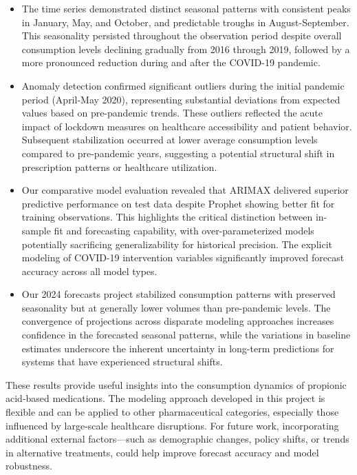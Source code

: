 \documentclass[10pt]{article}
\begin{document}
\begin{itemize}
    \item The time series demonstrated distinct seasonal patterns with consistent peaks in January, May, and October, and predictable troughs in August-September. This seasonality persisted throughout the observation period despite overall consumption levels declining gradually from 2016 through 2019, followed by a more pronounced reduction during and after the COVID-19 pandemic.
    \item Anomaly detection confirmed significant outliers during the initial pandemic period (April-May 2020), representing substantial deviations from expected values based on pre-pandemic trends. These outliers reflected the acute impact of lockdown measures on healthcare accessibility and patient behavior. Subsequent stabilization occurred at lower average consumption levels compared to pre-pandemic years, suggesting a potential structural shift in prescription patterns or healthcare utilization.
    \item Our comparative model evaluation revealed that ARIMAX delivered superior predictive performance on test data despite Prophet showing better fit for training observations. This highlights the critical distinction between in-sample fit and forecasting capability, with over-parameterized models potentially sacrificing generalizability for historical precision. The explicit modeling of COVID-19 intervention variables significantly improved forecast accuracy across all model types.
    \item Our 2024 forecasts project stabilized consumption patterns with preserved seasonality but at generally lower volumes than pre-pandemic levels. The convergence of projections across disparate modeling approaches increases confidence in the forecasted seasonal patterns, while the variations in baseline estimates underscore the inherent uncertainty in long-term predictions for systems that have experienced structural shifts.
\end{itemize}

These results provide useful insights into the consumption dynamics of propionic acid-based medications. The modeling approach developed in this project is flexible and can be applied to other pharmaceutical categories, especially those influenced by large-scale healthcare disruptions. For future work, incorporating additional external factors—such as demographic changes, policy shifts, or trends in alternative treatments, could help improve forecast accuracy and model robustness.
\end{document}

